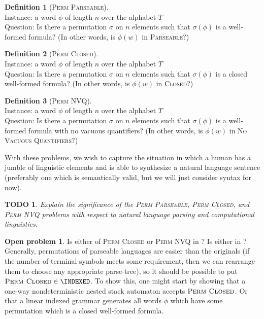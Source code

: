 \documentclass{article}
\newtheorem{todo}{TODO}
\theoremstyle{definition}
\newtheorem{definition}{Definition}
\newtheorem{openproblem}{Open problem}
\newcommand{\CLOSED}{\textsc{Closed}}
\newcommand{\PARSEABLE}{\textsc{Parseable}}
\newcommand{\NVQ}{\textsc{No Vacuous Quantifiers}}
\newcommand{\pp}{\textsc{Perm Parseable}}
\newcommand{\pc}{\textsc{Perm Closed}}
\newcommand{\pn}{\textsc{Perm NVQ}}
\newenvironment{langdef}[1]{\begin{definition}[#1]\mbox{}}{\end{definition}}
\newenvironment{instance}{\\Instance:}{}
\newenvironment{question}{\\Question:}{}
\begin{document}
\begin{langdef}{\pp}
  \begin{instance}
    a word $\phi$ of length $n$ over the alphabet $T$
  \end{instance}
  \begin{question}
    Is there a permutation $\sigma$ on $n$ elements such that $\sigma(\phi)$ is a well-formed formula?
    (In other words, is $\phi(w)$ in \PARSEABLE?)
  \end{question}
\end{langdef}

\begin{langdef}{\pc}
  \begin{instance}
    a word $\phi$ of length $n$ over the alphabet $T$
  \end{instance}
  \begin{question}
    Is there a permutation $\sigma$ on $n$ elements such that $\sigma(\phi)$ is a closed well-formed formula?
    (In other words, is $\phi(w)$ in \CLOSED?)
  \end{question}
\end{langdef}

\begin{langdef}{\pn}
  \begin{instance}
    a word $\phi$ of length $n$ over the alphabet $T$
  \end{instance}
  \begin{question}
    Is there a permutation $\sigma$ on $n$ elements such that $\sigma(\phi)$ is a well-formed formula with no vacuous quantifiers?
    (In other words, is $\phi(w)$ in \NVQ?)
  \end{question}
\end{langdef}

With these problems, we wish to capture the situation in which a human has a jumble of linguistic elements and is able to synthesize a natural language sentence (preferably one which is semantically valid, but we will just consider syntax for now).

\begin{todo}
  Explain the significance of the \pp, \pc, and \pn{} problems with respect to natural language parsing and computational linguistics.
\end{todo}

\begin{openproblem}
  Is either of \pc{} or \pn{} in \INDEXED?
  Is either in \MCSL?
  Generally, permutations of parseable languages are easier than the originals (if the number of terminal symbols meets some requirement, then we can rearrange them to choose any appropriate parse-tree), so it should be possible to put $\pc \in \INDEXED$.
  To show this, one might start by showing that a one-way nondeterministic nested stack automaton accepts $\pc$.
  Or that a linear indexed grammar generates all words $\phi$ which have some permutation which is a closed well-formed formula.
\end{openproblem}
\end{document}
